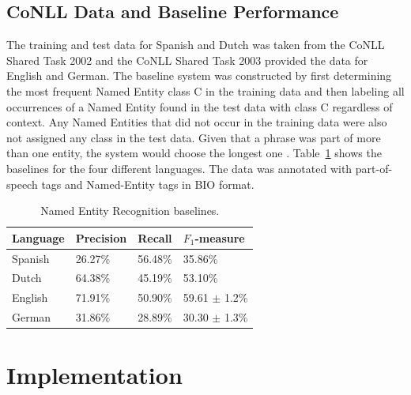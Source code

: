 \documentclass[11pt]{article}
\begin{document}
\subsection{CoNLL Data and Baseline Performance}
The training and test data for Spanish and Dutch was taken from the CoNLL Shared Task 2002 \cite{tksintro} and 
the CoNLL Shared Task 2003 \cite{TjongKimSang:2003:ICS:1119176.1119195} provided the data for English and German.
The baseline system was constructed by first determining the most frequent Named Entity class C in the training data and then labeling all occurrences of a Named Entity found in the test data with class C regardless of context. 
Any Named Entities that did not occur in the training data were also not assigned any class in the test data.
Given that a phrase was part of more than one entity, the system would choose the longest one \cite{TjongKimSang:2003:ICS:1119176.1119195}.
Table~\ref{table:Base} shows the baselines for the four different languages.  
The data was annotated with part-of-speech tags and Named-Entity tags in BIO format. %


\begin{table}[h!]
\small
\begin{tabular}{|l|l|l|l|}
\hline
\bf Language & \bf Precision & \bf Recall & \bf $F_1$-measure \\ \hline
Spanish &             26.27\% & 56.48\% & 35.86\%        \\
Dutch  &             64.38\%  &45.19\%    & 53.10\%  \\
English &              71.91\%& 50.90\%  & 59.61 $\pm$ 1.2\%\\
German &      31.86\%  & 28.89\% & 30.30  $\pm$ 1.3\% \\
\hline
\end{tabular}
\caption{Named Entity Recognition baselines.}
\label{table:Base}
\end{table}



\section{Implementation}
\end{document}
